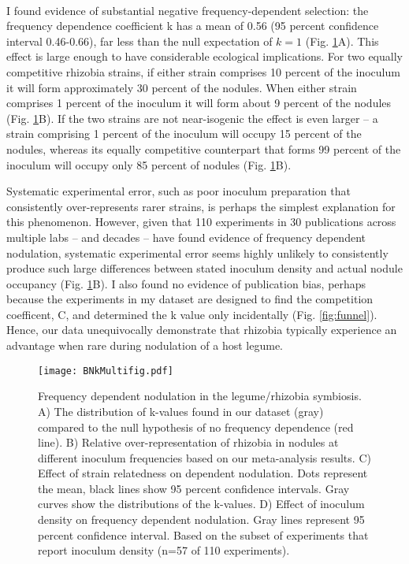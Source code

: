 \documentclass[12pt]{article}
\begin{document}
\begin{doublespace}
\begin{table}[]
\end{table}

\paragraph{}
I found evidence of substantial negative frequency-dependent selection: the frequency dependence coefficient k has a mean of 0.56 (95 percent confidence interval 0.46-0.66), far less than the null expectation of $k = 1$ (Fig. \ref{fig:kfig}A). This effect is large enough to have considerable ecological implications. For two equally competitive rhizobia strains, if either strain comprises 10 percent of the inoculum it will form approximately 30 percent of the nodules. When either strain comprises 1 percent of the inoculum it will form about 9 percent of the nodules (Fig. \ref{fig:kfig}B). If the two strains are not near-isogenic the effect is even larger -- a strain comprising 1 percent of the inoculum will occupy 15 percent of the nodules, whereas its equally competitive counterpart that forms 99 percent of the inoculum will occupy only 85 percent of nodules (Fig. \ref{fig:kfig}B). 

Systematic experimental error, such as poor inoculum preparation that consistently over-represents rarer strains, is perhaps the simplest explanation for this phenomenon. However, given that 110 experiments in 30 publications across multiple labs -- and decades -- have found evidence of frequency dependent nodulation, systematic experimental error seems highly unlikely to consistently produce such large differences between stated inoculum density and actual nodule occupancy (Fig. \ref{fig:kfig}B). I also found no evidence of publication bias, perhaps because the experiments in my dataset are designed to find the competition coefficent, C, and determined the k value only incidentally (Fig. \ref{fig:funnel}). Hence, our data unequivocally demonstrate that rhizobia typically experience an advantage when rare during nodulation of a host legume.
\begin{figure}[h!]
	\texttt{[image: BNkMultifig.pdf]}
	\caption{Frequency dependent nodulation in the legume/rhizobia symbiosis.
		\newline A)  The distribution of k-values found in our dataset (gray) compared to the null hypothesis of no frequency dependence (red line).
		\newline B) Relative over-representation of rhizobia in nodules at different inoculum frequencies based on our meta-analysis results. 
		\newline C) Effect of strain relatedness on dependent nodulation. Dots represent the mean, black lines show 95 percent confidence intervals. Gray curves show the distributions of the k-values.
		\newline D) Effect of inoculum density on frequency dependent nodulation. Gray lines represent 95 percent confidence interval. Based on the subset of experiments that report inoculum density (n=57 of 110 experiments).}
	\label{fig:kfig}
\end{figure}
\pagebreak

\end{doublespace}
\end{document}
